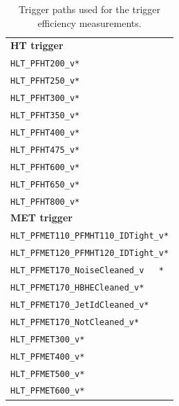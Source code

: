 \begin{table}[htb]
 \centering
 \caption{Trigger paths used for the trigger efficiency measurements.}
 \normalsize
 \label{tab:app_trigger2}
 \begin{tabular}[width=\textwidth]{l}
  \hline
  \normalsize{\textbf{HT trigger}}  \\
  \verb|HLT_PFHT200_v*|           \\
  \verb|HLT_PFHT250_v*|           \\
  \verb|HLT_PFHT300_v*|           \\
  \verb|HLT_PFHT350_v*|           \\
  \verb|HLT_PFHT400_v*|           \\
  \verb|HLT_PFHT475_v*|           \\
  \verb|HLT_PFHT600_v*|           \\
  \verb|HLT_PFHT650_v*|           \\
  \verb|HLT_PFHT800_v*|           \\
  \normalsize{\textbf{MET trigger}} \\
  \verb|HLT_PFMET110_PFMHT110_IDTight_v*|           \\
  \verb|HLT_PFMET120_PFMHT120_IDTight_v*|           \\
  \verb|HLT_PFMET170_NoiseCleaned_v   *|           \\
  \verb|HLT_PFMET170_HBHECleaned_v*|           \\
  \verb|HLT_PFMET170_JetIdCleaned_v*|           \\
  \verb|HLT_PFMET170_NotCleaned_v*|           \\
  \verb|HLT_PFMET300_v*|           \\
  \verb|HLT_PFMET400_v*|           \\
  \verb|HLT_PFMET500_v*|           \\
  \verb|HLT_PFMET600_v*|           \\
  \hline
 \end{tabular}
 \vspace{\baselineskip}
\end{table}

